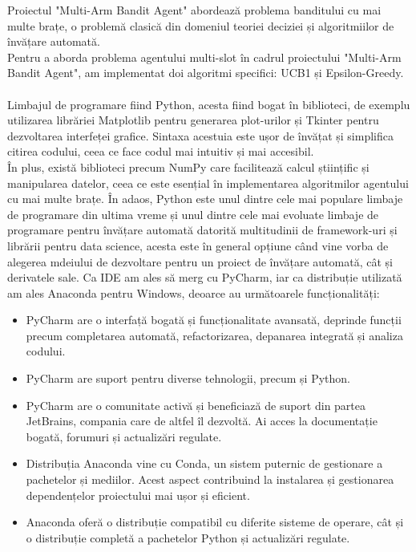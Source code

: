 \documentclass{article}
\begin{document}
Proiectul "Multi-Arm Bandit Agent" abordează problema banditului cu mai multe brațe, o problemă clasică din domeniul teoriei deciziei și algoritmiilor de învățare automată.\\
Pentru a aborda problema agentului multi-slot în cadrul proiectului "Multi-Arm Bandit Agent", am implementat doi algoritmi specifici: UCB1 și Epsilon-Greedy.\\\\
Limbajul de programare fiind Python, acesta fiind bogat în biblioteci, de exemplu utilizarea librăriei Matplotlib pentru generarea plot-urilor și Tkinter pentru dezvoltarea interfeței grafice. Sintaxa acestuia este ușor de învățat și simplifica citirea codului, ceea ce face codul mai intuitiv și mai accesibil.\\
În plus, există biblioteci precum NumPy care facilitează calcul științific și manipularea datelor, ceea ce este esențial în implementarea algoritmilor agentului cu mai multe brațe.
În adaos, Python este unul dintre cele mai populare limbaje de programare din ultima vreme  și unul dintre cele mai evoluate limbaje de programare pentru învățare automată datorită multitudinii de framework-uri și librării pentru data science, acesta este în general opțiune când vine vorba de alegerea mdeiului de dezvoltare pentru un proiect de învățare automată, cât și derivatele sale. 
Ca IDE am ales să merg cu PyCharm, iar ca distribuție utilizată am ales Anaconda pentru Windows, deoarce au următoarele funcționalități:
\begin{itemize}
      \item PyCharm are o interfață bogată și funcționalitate avansată, deprinde funcții precum completarea automată, refactorizarea, depanarea integrată și analiza codului.
       \item PyCharm are suport pentru diverse tehnologii, precum și Python.
       \item PyCharm are o comunitate activă și beneficiază de suport din partea JetBrains, compania care de altfel îl dezvoltă. Ai acces la documentație bogată, forumuri și actualizări regulate.
       \item Distribuția Anaconda vine cu Conda, un sistem puternic de gestionare a pachetelor și mediilor. Acest aspect contribuind la instalarea și gestionarea dependențelor proiectului mai ușor și eficient.
       \item Anaconda oferă o distribuție compatibil cu diferite sisteme de operare, cât și o distribuție completă a pachetelor Python și actualizări regulate.
\end{itemize}
\end{document}
